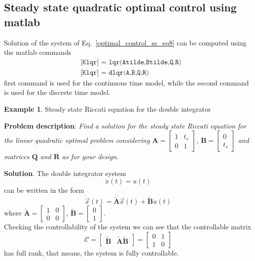 \documentclass[11pt,a4paper,oneside]{book}
\numberwithin{equation}{section}
\theoremstyle{it}
\theoremstyle{definition}
\newtheorem{example}{Example}[chapter]
\begin{document}
\subsection{Steady state quadratic optimal control using matlab}
Solution of the system of Eq.~\eqref{optimal_control_ss_eq8} can be computed using the matlab commands
\begin{equation}
	\begin{aligned}
		&\texttt{[Klqr] = lqr(Atilde,Btilde,Q,R)} \\[6pt]
		&\texttt{[Klqr] = dlqr(A,B,Q,R)}
	\end{aligned}
\end{equation}
first command is used for the continuous time model, while the second command is used for the discrete time model.
\begin{example}{Steady state Riccati equation for the double integrator}
	
\textbf{Problem description}:
\textit{Find a solution for the steady state Riccati equation for the linear quadratic optimal problem considering 
	$\mathbf{A}=\begin{bmatrix}1&t_s\\0&1\end{bmatrix}$, 
	$\mathbf{B}=\begin{bmatrix}0\\t_s\end{bmatrix}$ and matrices $\mathbf{Q}$ 
	and $\mathbf{R}$ as for your design.}
\vspace{10mm}

\noindent\textbf{Solution}.
The double integrator system 
\begin{equation}\label{example_riccati_eq1}
	\ddot{x}(t)=u(t)
\end{equation}
can be written in the form 
\begin{equation}\label{example_riccati_eq2}
	\dot{\vec{x}}(t)=\tilde{\mathbf{A}}\vec{x}(t)+\tilde{\mathbf{B}}u(t)
\end{equation}
where $\tilde{\mathbf{A}}=\begin{bmatrix}1&0\\0&0\end{bmatrix}$, 
$\tilde{\mathbf{B}}=\begin{bmatrix}0\\1\end{bmatrix}$. \\

Checking the controllability of the system we can see that the controllable matrix 
\begin{equation}
	\mathcal{C}=\begin{bmatrix}
		\tilde{\mathbf{B}} & \tilde{\mathbf{A}}\tilde{\mathbf{B}}
	\end{bmatrix} = \begin{bmatrix} 0&1 \\ 1&0 \end{bmatrix}
\end{equation}
has full rank, that means, the system is fully controllable.


\end{example}
\end{document}
